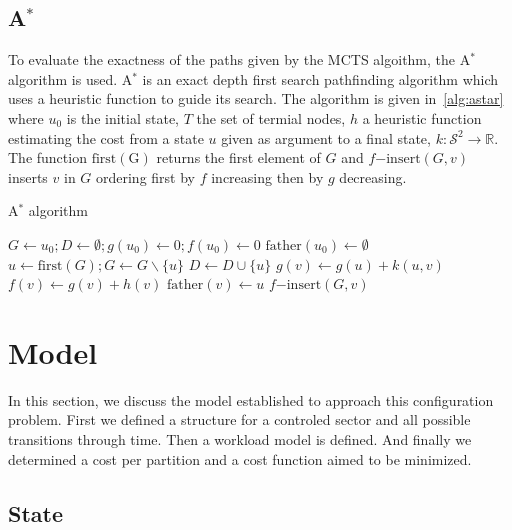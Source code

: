 \documentclass[twoside,twocolumn]{article}
\begin{document}
\subsection{A\(^*\)}
To evaluate the exactness of the paths given by the MCTS algoithm, the A\(^*\)
algorithm is used. A\(^*\) is an exact depth first search pathfinding algorithm
which uses a heuristic function to guide its search. The algorithm is given
in~\ref{alg:astar} where \(u_0\) is the initial state, \(T\) the set of termial
nodes, \(h\) a heuristic function estimating the cost from a state \(u\) given
as argument to a final state, \(k \colon \mathcal{S}^2 \to \mathbb{R}\). The
function \(\mathup{first(G)}\) returns the first element of \(G\) and
\(f\mathup{-insert}(G, v)\) inserts \(v\) in \(G\) ordering first by \(f\)
increasing then by \(g\) decreasing.
\begin{algorithm}
  \caption{A\(^*\) algorithm~\cite{alliotschiex2002ia&it}}\label{alg:astar}
  \begin{algorithmic}
    \State{}\(G \gets u_0; D \gets \emptyset; g(u_0) \gets 0; f(u_0) \gets 0\)
    \State{}\(\mathup{father}(u_0) \gets \emptyset\)
    \State{}\(u \gets \mathup{first}(G); G \gets G \backslash \{u\}\)
    \State{}\(D \gets D \cup \{u\}\)
    \State{}
    \EndIf{}
    \State{}\(g(v) \gets g(u) + k(u, v)\)
    \State{}\(f(v) \gets g(v) + h(v)\)
    \State{}\(\mathup{father}(v) \gets u\)
    \State{}\(f\mathup{-insert}(G, v)\)
    \EndIf{}
    \EndFor{}
    \EndWhile{}
    \EndProcedure{}
  \end{algorithmic}
\end{algorithm}
\section{Model}

In this section, we discuss the model established to approach this configuration
problem. First we defined a structure for a controled sector and all possible
transitions through time. Then a workload model is defined. And finally we
determined a cost per partition and a cost function aimed to be minimized.

\subsection{State}
\end{document}
